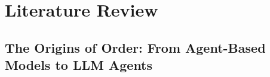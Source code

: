 \chapter{Literature Review} %
\label{LiteratureReview}

%

\section{The Origins of Order: From Agent-Based Models to LLM Agents}


